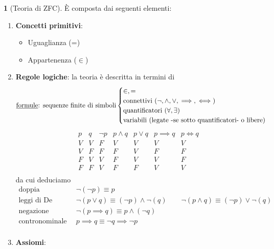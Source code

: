 \documentclass[a4paper,10pt]{article}
\theoremstyle{definition}
\theoremstyle{indentdefinition}
\theoremstyle{indentpostulate}
\theoremstyle{indenttheorem}
\theoremstyle{myremark}
\theoremstyle{indentgeneral}
\newtheorem*{gen}{}
\newenvironment{myboxed} 
{\noindent\begin{lrbox}{\mybox}\begin{minipage}{\textwidth}}
{\end{minipage}\end{lrbox}\fbox{\usebox{\mybox}}}
\begin{document}
\begin{myboxed}
    \begin{gen}[Teoria di ZFC] È composta dai seguenti elementi:
    \begin{enumerate}
        \item \textbf{Concetti primitivi}: 
        \begin{itemize}
            \item Uguaglianza (=)
            \item Appartenenza ($\in$)
            \end{itemize}
            
        \item \textbf{Regole logiche}: la teoria è descritta in termini di
            $$\text{\underline{formule}: sequenze finite di simboli}\begin{cases}
                \in,=\\
                \text{connettivi } (\neg,\land,\lor,\implies,\iff)\\
                \text{quantificatori } (\forall,\exists)\\
                \text{variabili (legate -se sotto quantificatori- o libere)}
            \end{cases}$$
        $$\begin{array}{|c|c|c|c|c|c|c|}
            p & q & \neg p & p\land q & p\lor q & p\implies q & p\iff q  \\
            V & V & F & V & V & V & V  \\
            V & F & F & F & V & F & F  \\
            F & V & V & F & V & V & F  \\
            F & F & V & F & F & V & V  \\
        \end{array}$$
        da cui deduciamo
        $$\begin{array}{ll}
            \text{doppia negazione} & \neg(\neg p)\equiv p \\
             \text{leggi di De Morgan} & \neg(p\lor q)\equiv (\neg p)\land \neg(q)\qquad \neg(p\land q)\equiv (\neg p)\lor \neg(q)  \\
             \text{negazione dell'implicazione} & \neg(p\implies q)\equiv p\land (\neg q) \\
             \text{contronominale} & p\implies q \equiv \neg q\implies \neg p \\
        \end{array}$$
        \item \textbf{Assiomi}:

\end{enumerate}
\end{gen}
\end{myboxed}
\end{document}
